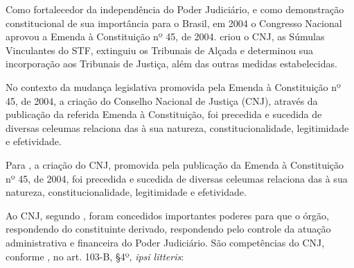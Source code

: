 Como fortalecedor da independência do Poder Judiciário, e como demonstração constitucional de sua importância para o Brasil, em 2004 o Congresso Nacional aprovou a Emenda à Constituição nº 45, de 2004. \cite{ec45_2004} criou o CNJ, as Súmulas Vinculantes do STF, extinguiu os Tribunais de Alçada e determinou sua incorporação aos Tribunais de Justiça, além das outras medidas estabelecidas.

No contexto da mudança legislativa promovida pela  Emenda à Constituição nº 45, de 2004, a criação do Conselho Nacional de Justiça (CNJ), através da publicação da referida Emenda à Constituição, foi precedida e sucedida de diversas celeumas relaciona das à sua natureza, constitucionalidade, legitimidade e efetividade.

Para \cite{silva2013transparencia}, a criação do CNJ, promovida pela publicação da Emenda à Constituição nº 45, de 2004, foi precedida e sucedida de diversas celeumas relaciona das à sua natureza, constitucionalidade, legitimidade e efetividade.  

Ao CNJ, segundo \cite{silva2013transparencia}, foram concedidos importantes poderes para que o órgão, respondendo do constituinte derivado, respondendo pelo controle da atuação administrativa e financeira do Poder Judiciário. São competências do CNJ, conforme \cite{cf88}, no art. 103-B, §4º, \textit{ipsi litteris}:


